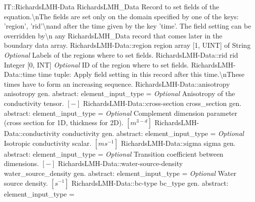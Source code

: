 \begin{RecordType}
	{IT::RichardsLMH-Data}
	{RichardsLMH{\_}Data}
	{}%
	{}%
	{{{Record to set fields of the equation.{\textbackslash}nThe fields are set only on the domain specified by one of the keys: 'region', 'rid'{\textbackslash}nand after the time given by the key 'time'. The field setting can be overridden by{\textbackslash}n any RichardsLMH{\_}Data record that comes later in the boundary data array.}%
}}
		\RecKey
			{RichardsLMH-Data::region}
			{region}
			{{array [1, UINT] of }{String}}{}
			{ \it{Optional}}
			{{{Labels of the regions where to set fields. }%
}}
		\RecKey
			{RichardsLMH-Data::rid}
			{rid}
			{{Integer [0, INT]}}{}
			{ \it{Optional}}
			{{{ID of the region where to set fields.}%
}}
		\RecKey
			{RichardsLMH-Data::time}
			{time}
			{{tuple: }}{}
			{ }
			{{{Apply field setting in this record after this time.{\textbackslash}nThese times have to form an increasing sequence.}%
}}
		\RecKey
			{RichardsLMH-Data::anisotropy}
			{anisotropy}
			{{gen. abstract: }}{{element{\_}input{\_}type}{ = }}
			{ \it{Optional}}
			{{{Anisotropy of the conductivity tensor. }{$[-]$}%
}}
		\RecKey
			{RichardsLMH-Data::cross-section}
			{cross{\_}section}
			{{gen. abstract: }}{{element{\_}input{\_}type}{ = }}
			{ \it{Optional}}
			{{{Complement dimension parameter (cross section for 1D, thickness for 2D). }{$[m^{3-d}]$}%
}}
		\RecKey
			{RichardsLMH-Data::conductivity}
			{conductivity}
			{{gen. abstract: }}{{element{\_}input{\_}type}{ = }}
			{ \it{Optional}}
			{{{Isotropic conductivity scalar. }{$[ms^{-1}]$}%
}}
		\RecKey
			{RichardsLMH-Data::sigma}
			{sigma}
			{{gen. abstract: }}{{element{\_}input{\_}type}{ = }}
			{ \it{Optional}}
			{{{Transition coefficient between dimensions. }{$[-]$}%
}}
		\RecKey
			{RichardsLMH-Data::water-source-density}
			{water{\_}source{\_}density}
			{{gen. abstract: }}{{element{\_}input{\_}type}{ = }}
			{ \it{Optional}}
			{{{Water source density. }{$[s^{-1}]$}%
}}
		\RecKey
			{RichardsLMH-Data::bc-type}
			{bc{\_}type}
			{{gen. abstract: }}{{element{\_}input{\_}type}{ = }}

\end{RecordType}
